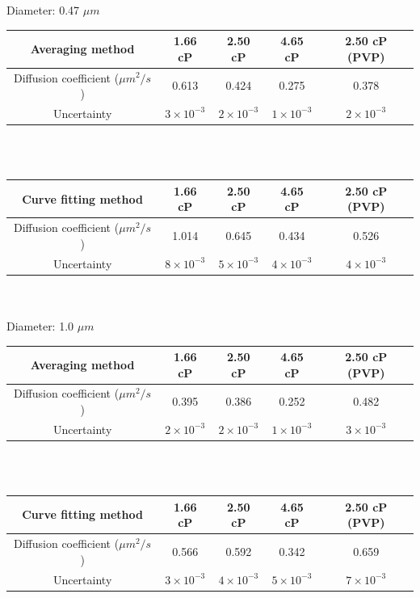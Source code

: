 \documentclass[11pt,letterpaper]{article}
\begin{document}
Diameter: 0.47 $\mu m$\\
\begin{tabular}{| c | c | c | c | c |}
    \hline
    Averaging method & 1.66 cP & 2.50 cP & 4.65 cP & 2.50 cP (PVP) \\
    \hline
    Diffusion coefficient ($\mu m^2 / s$) &
        0.613 &
        0.424 &
        0.275 &
        0.378 \\
    \hline
    Uncertainty &
        $3 \times 10^{-3}$ &
        $2 \times 10^{-3}$ &
        $1 \times 10^{-3}$ &
        $2 \times 10^{-3}$ \\
    \hline
\end{tabular}

\ \\
\ \\
\begin{tabular}{| c | c | c | c | c |}
    \hline
    Curve fitting method & 1.66 cP & 2.50 cP & 4.65 cP & 2.50 cP (PVP) \\
    \hline
    Diffusion coefficient ($\mu m^2 / s$) &
        1.014 &
        0.645 &
        0.434 &
        0.526 \\
    \hline
    Uncertainty &
        $8 \times 10^{-3}$ &
        $5 \times 10^{-3}$ &
        $4 \times 10^{-3}$ &
        $4 \times 10^{-3}$ \\
    \hline
\end{tabular}

\ \\
\ \\
Diameter: 1.0 $\mu m$\\
\begin{tabular}{| c | c | c | c | c |}
    \hline
    Averaging method & 1.66 cP & 2.50 cP & 4.65 cP & 2.50 cP (PVP) \\
    \hline
    Diffusion coefficient ($\mu m^2 / s$) &
        0.395 &
        0.386 &
        0.252 &
        0.482 \\
    \hline
    Uncertainty &
        $2 \times 10^{-3}$ &
        $2 \times 10^{-3}$ &
        $1 \times 10^{-3}$ &
        $3 \times 10^{-3}$ \\
    \hline
\end{tabular}

\ \\
\ \\
\begin{tabular}{| c | c | c | c | c |}
    \hline
    Curve fitting method & 1.66 cP & 2.50 cP & 4.65 cP & 2.50 cP (PVP) \\
    \hline
    Diffusion coefficient ($\mu m^2 / s$) &
        0.566 &
        0.592 &
        0.342 &
        0.659 \\
    \hline
    Uncertainty &
        $3 \times 10^{-3}$ &
        $4 \times 10^{-3}$ &
        $5 \times 10^{-3}$ &
        $7 \times 10^{-3}$ \\
    \hline
\end{tabular}
\end{document}
